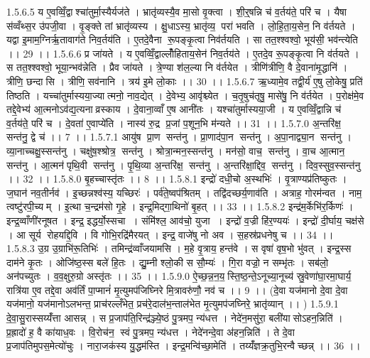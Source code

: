 1.5.6.5
य ए॒वव्विँ॒द्वाश्चा॑तुर्मा॒स्यैर्यज॑ते । भ्रातृ॑व्यस्यै॒व मा॒सो वृ॒क्त्वा । शी॒र्॒षन्नि च॑ व॒र्तय॑ते॒ परि॑ च । यैषा स॑व्वँथ्स॒र उ॑पजी॒वा । वृ॒ङ्क्ते तां भ्रातृ॑व्यस्य । क्षु॒धाऽस्य॒ भ्रातृ॑व्य॒ परा॑ भवति । लो॒हि॒ता॒य॒सेन॒ नि व॑र्तयते । यद्वा इ॒माम॒ग्निर्ऋ॒तावाग॑ते निव॒र्तय॑ति । ए॒तदे॒वैना॑ रू॒पङ्कृ॒त्वा निव॑र्तयति । सा तत॒श्श्वश्वो॒ भूय॑सी॒ भव॑न्त्येति ।। 29 ।।
1.5.6.6
प्र जा॑यते । य ए॒वव्विँ॒द्वाल्लोँ॑हिताय॒सेन॑ निव॒र्तय॑ते । ए॒तदे॒व रू॒पङ्कृ॒त्वा नि व॑र्तयते । स तत॒श्श्वश्वो॒ भूया॒न्भव॑न्नेति । प्रैव जा॑यते । त्रे॒ण्या श॑ल॒ल्या नि व॑र्तयेत । त्रीणि॑त्रीणि॒ वै दे॒वाना॑मृ॒द्धानि॑ । त्रीणि॒ छन्दा॑सि । त्रीणि॒ सव॑नानि । त्रय॑ इ॒मे लो॒काः ।। 30 ।।
1.5.6.7
ऋ॒ध्यामे॒व तद्वी॒र्य॑ ए॒षु लो॒केषु॒ प्रति॑ तिष्ठति । यच्चा॑तुर्मास्यया॒ज्यात्मनो॒ नाव॒द्येत् । दे॒वेभ्य॒ आवृ॑श्च्येत । च॒तृ॒षुच॑तृषु॒ मासे॑षु॒ नि व॑र्तयेत । प॒रोक्ष॑मे॒व तद्दे॒वेभ्य॑ आ॒त्मनोऽव॑द्य॒त्यनाव्रस्काय । दे॒वाना॒व्वाँ ए॒ष आनी॑तः । यश्चा॑तुर्मास्यया॒जी । य ए॒वव्विँ॒द्वान्नि च॑ व॒र्तय॑ते॒ परि॑ च । दे॒वता॑ ए॒वाप्ये॑ति । नास्य॑ रु॒द्र प्र॒जां प॒शून॒भि म॑न्यते ।। 31 ।।
1.5.7.0
अ॒न्तरि॑क्ष॒॒ सन्त॑नु॒ द्वे च॑ ।। 7 ।।
1.5.7.1
आयु॑ष प्रा॒ण सन्त॑नु । प्रा॒णाद॑पा॒न सन्त॑नु । अ॒पा॒नाद्व्या॒न सन्त॑नु । व्या॒नाच्चक्षु॒स्सन्त॑नु । चक्षु॑ष॒श्श्रोत्र॒॒ सन्त॑नु । श्रोत्रा॒न्मन॒स्सन्त॑नु । मन॑सो॒ वाच॒॒ सन्त॑नु । वा॒च आ॒त्मान॒॒ सन्त॑नु । आ॒त्मन॑पृथि॒वी सन्त॑नु । पृ॒थि॒व्या अ॒न्तरि॑क्ष॒॒ सन्त॑नु । अ॒न्तरि॑क्षा॒द्दिव॒ ॒सन्त॑नु । दिव॒स्सुव॒स्सन्त॑नु ।। 32 ।।
1.5.8.0
बृ॒हच्चास्तृ॑तः ।। 8 ।।
1.5.8.1
इन्द्रो॑ दधी॒चो अ॒स्थभिः॑ । वृ॒त्राण्यप्र॑तिष्कुतः । ज॒घान॑ नव॒तीर्नव॑ । इ॒च्छन्नश्व॑स्य॒ यच्छिरः॑ । पर्व॑ते॒ष्वप॑श्रितम् । तद्वि॑दच्छर्य॒णाव॑ति । अत्राह॒ गोरम॑न्वत । नाम॒ त्वष्टु॑रपी॒च्यम् । इ॒त्था च॒न्द्रम॑सो गृ॒हे । इन्द्र॒मिद्गा॒थिनो॑ बृ॒हत् ।। 33 ।।
1.5.8.2
इन्द्र॑म॒र्केभि॑र॒र्किणः॑ । इन्द्र॒व्वाँणी॑रनूषत । इन्द्र॒ इद्धर्यो॒स्सचा । संमि॑श्ल॒ आव॑चो॒ युजा । इन्द्रो॑ व॒ज्री हि॑र॒ण्ययः॑ । इन्द्रो॑ दी॒र्घाय॒ चक्ष॑से । आ सूर्य॑ रोहयद्दि॒वि । वि गोभि॒रद्रि॑मैरयत् । इन्द्र॒ वाजे॑षु नो अव । स॒हस्र॑प्रधनेषु च ।। 34 ।।
1.5.8.3
उ॒ग्र उ॒ग्राभि॑रू॒तिभिः॑ । तमिन्द्र॑व्वाँजयामसि । म॒हे वृ॒त्राय॒ हन्त॑वे । स वृषा॑ वृष॒भो भु॑वत् । इन्द्र॒स्स दाम॑ने कृ॒तः । ओजि॑ष्ठ॒स्स बले॑ हि॒तः । द्यु॒म्नी श्लो॒की स सौ॒म्यः॑ । गि॒रा वज्रो॒ न सम्भृ॑तः । सब॑लो॒ अन॑पच्युतः । व॒व॒क्षुरु॒ग्रो अस्तृ॑तः ।। 35 ।।
1.5.9.0
ऐ॒च्छ॒न्न॒न॒य॒॒स्ति॒ष्ठ॒न्ते॒ऽनूच्या॒नूच्य॑ स्रु॒वेणा॑घा॒रमा॒घार्य॒ रात्रि॑या ए॒व तद्दे॒वा अव॑र्तिं पा॒प्मानं॑ मृ॒त्युमप॑जिघ्निरे मि॒त्रावरु॑णौ॒ नव॑ च ।। 9 ।। (दे॒वा यज॑मानो दे॒वा दे॒वा यज॑मानो॒ यज॑मानोऽलभन्त॒ प्राच॑रल्लँभेत॒ प्रच॑रे॒दाल॑भ॒न्ताल॑भेत मृ॒त्युमप॑जघ्निरे॒ भ्रातृ॑व्यान् ।। )
1.5.9.1
दे॒वा॒सु॒रास्सय्यँ॑त्ता आसन्न् । स प्र॒जाप॑ति॒रिन्द्र॑ञ्ज्ये॒ष्ठं पु॒त्रमप॒ न्य॑धत्त । नेदे॑न॒मसु॑रा॒ बली॑यासोऽहन॒न्निति॑ । प्र॒ह्रादो॑ ह॒ वै का॑याध॒वः । वि॒रोच॑न॒॒ स्वं पु॒त्रमप॒ न्य॑धत्त । नेदे॑नन्दे॒वा अ॑हन॒न्निति॑ । ते दे॒वा प्र॒जाप॑तिमुपस॒मेत्यो॑चुः । नारा॒जक॑स्य यु॒द्धम॑स्ति । इन्द्र॒मन्वि॑च्छा॒मेति॑ । तय्यँ॑ज्ञक्र॒तुभि॒रन्वैच्छन्न् ।। 36 ।।
